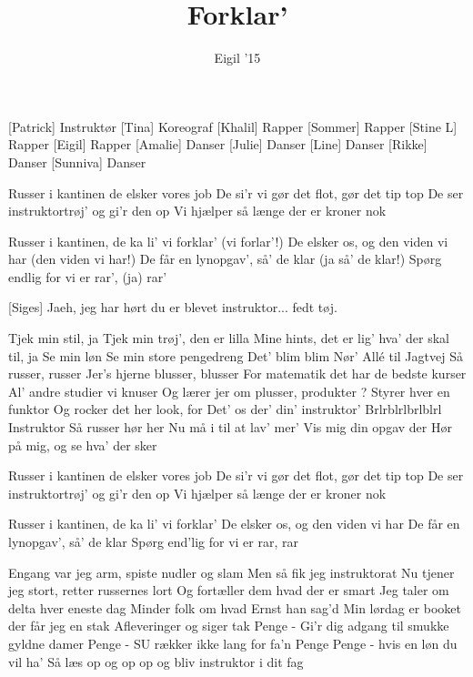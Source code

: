 \documentclass[a4paper,11pt]{article}
\title{Forklar'}
\author{Eigil '15}
\begin{document}
\maketitle

\begin{roles}
[Patrick] Instruktør
[Tina] Koreograf
[Khalil] Rapper
[Sommer] Rapper
[Stine L] Rapper
[Eigil] Rapper
[Amalie] Danser
[Julie] Danser
[Line] Danser
[Rikke] Danser
[Sunniva] Danser
\end{roles}

\begin{song}
 Russer i kantinen de elsker vores job
De si'r vi gør det flot, gør det tip top
De ser instruktortrøj' og gi'r den op
Vi hjælper så længe der er kroner nok

 Russer i kantinen, de ka li' vi forklar' (vi forlar'!)
De elsker os, og den viden vi har (den viden vi har!)
De får en lynopgav', så' de klar (ja så' de klar!)
Spørg endlig for vi er rar', (ja) rar'

[Siges] Jaeh, jeg har hørt du er blevet instruktor... fedt tøj.

 Tjek min stil, ja
Tjek min trøj', den er lilla
Mine hints, det er lig' hva' der skal til, ja
Se min løn
Se min store pengedreng
Det' blim blim
Nør' Allé til Jagtvej
Så russer, russer
Jer's hjerne blusser, blusser
For matematik det har de bedste kurser
Al' andre studier vi knuser
Og lærer jer om plusser, produkter {?}
Styrer hver en funktor
Og rocker det her look, for
Det' os der' din' instruktor'
Brlrblrlbrlblrl
Instruktor
Så russer hør her
Nu må i til at lav' mer'
Vis mig din opgav der
Hør på mig, og se hva' der sker

 Russer i kantinen de elsker vores job
De si'r vi gør det flot, gør det tip top
De ser instruktortrøj' og gi'r den op
Vi hjælper så længe der er kroner nok

 Russer i kantinen, de ka li' vi forklar'
De elsker os, og den viden vi har
De får en lynopgav', så' de klar
Spørg end'lig for vi er rar, rar

 Engang var jeg arm, spiste nudler og slam
Men så fik jeg instruktorat
Nu tjener jeg stort, retter russernes lort
Og fortæller dem hvad der er smart
Jeg taler om delta hver eneste dag
Minder folk om hvad Ernst han sag'd
Min lørdag er booket der får jeg en stak
Afleveringer og siger tak
Penge - Gi'r dig adgang til smukke gyldne damer
Penge - SU rækker ikke lang for fa'n
Penge Penge - hvis en løn du vil ha'
Så læs op og op op og bliv instruktor i dit fag


\end{song}
\end{document}
